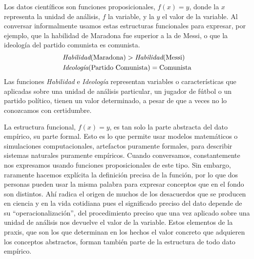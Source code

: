 \documentclass[a4paper,11pt]{book}
\theoremstyle{definition}
\begin{document}
Los datos científicos son funciones proposicionales, $f(x)=y$, donde la $x$ representa la unidad de análisis, $f$ la variable, y la $y$ el valor de la variable.
%
%
Al conversar informalmente usamos estas estructuras funcionales para expresar, por ejemplo, que la habilidad de Maradona fue superior a la de Messi, o que la ideología del partido comunista es comunista.
%
\begin{align*}\label{eq:opiniones}
& \emph{Habilidad}(\text{Maradona}) > \emph{Habilidad}(\text{Messi}) \\[0.0cm]
& \textit{Ideología}(\text{Partido Comunista}) = \text{Comunista}
\end{align*}
%
Las funciones \emph{Habilidad} e \emph{Ideología} representan variables o características que aplicadas sobre una unidad de análisis particular, un jugador de fútbol o un partido político, tienen un valor determinado, a pesar de que a veces no lo conozcamos con certidumbre.


La estructura funcional, $f(x)=y$, es tan solo la parte abstracta del dato empírico, su parte formal.
%
Esto es lo que permite usar modelos matemáticos o simulaciones computacionales, artefactos puramente formales, para describir sistemas naturales puramente empíricos.
%
Cuando conversamos, constantemente nos expresamos usando funciones proposicionales de este tipo.
%
Sin embargo, raramente hacemos explícita la definición precisa de la función, por lo que dos personas pueden usar la misma palabra para expresar conceptos que en el fondo son distintos.
%
Ahí radica el origen de muchos de los desacuerdos que se producen en ciencia y en la vida cotidiana pues el significado preciso del dato depende de su ``operacionalización'', del procedimiento preciso que una vez aplicado sobre una unidad de análisis nos devuelve el valor de la variable.
%
Estos elementos de la praxis, que son los que determinan en los hechos el valor concreto que adquieren los conceptos abstractos, forman también parte de la estructura de todo dato empírico.


\end{document}
